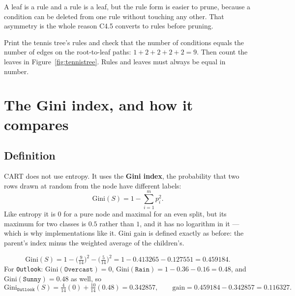 \documentclass[11pt]{article}
\begin{document}
\begin{keyidea}
A leaf is a rule and a rule is a leaf, but the rule form is easier to prune,
because a condition can be deleted from one rule without touching any other.
That asymmetry is the whole reason C4.5 converts to rules before pruning.
\end{keyidea}

\begin{tryit}
Print the tennis tree's rules and check that the number of conditions equals
the number of edges on the root-to-leaf paths: $1 + 2 + 2 + 2 + 2 = 9$. Then
count the leaves in Figure~\ref{fig:tennistree}. Rules and leaves must always
be equal in number.
\end{tryit}

\notesources{\AMLUnitVISources}

\section{The Gini index, and how it compares}
\label{sec:gini}

\subsection{Definition}

CART does not use entropy. It uses the \textbf{Gini index}, the probability
that two rows drawn at random from the node have different labels:
\begin{equation}
  \label{eq:gini}
  \mathrm{Gini}(S) = 1 - \sum_{i=1}^{m} p_i^2 .
\end{equation}
Like entropy it is $0$ for a pure node and maximal for an even split, but its
maximum for two classes is $0.5$ rather than $1$, and it has no logarithm in
it --- which is why implementations like it. Gini gain is defined exactly as
before: the parent's index minus the weighted average of the children's.

\begin{worked}
\[
  \mathrm{Gini}(S) = 1 - \Big(\tfrac{9}{14}\Big)^{\!2}
                       - \Big(\tfrac{5}{14}\Big)^{\!2}
    = 1 - 0.413265 - 0.127551 = \mathbf{0.459184}.
\]
For \texttt{Outlook}: $\mathrm{Gini}(\texttt{Overcast}) = 0$,
$\mathrm{Gini}(\texttt{Rain}) = 1 - 0.36 - 0.16 = 0.48$, and
$\mathrm{Gini}(\texttt{Sunny}) = 0.48$ as well, so
\[
  \mathrm{Gini}_{\texttt{Outlook}}(S)
   = \tfrac{4}{14}(0) + \tfrac{10}{14}(0.48) = 0.342857,
  \qquad \text{gain} = 0.459184 - 0.342857 = \mathbf{0.116327}.
\]
\end{worked}
\end{document}
